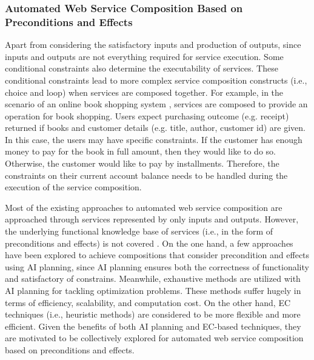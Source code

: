 \subsubsection{Automated Web Service Composition Based on Preconditions and Effects}
Apart from considering the satisfactory inputs and production of outputs, since inputs and outputs are not everything required for service execution. Some conditional constraints also determine the executability of services. These conditional constraints lead to more complex service composition constructs (i.e., choice and loop) when services are composed together. For example, in the scenario of an online book shopping system \cite{wang2014automated}, services are composed to provide an operation for book shopping.  Users expect purchasing outcome (e.g. receipt) returned if books and customer details (e.g. title, author, customer id) are given. In this case, the users may have specific constraints. If the customer has enough money to pay for the book in full amount, then they would like to do so. Otherwise, the customer would like to pay by installments. Therefore, the constraints on their current account balance needs to be handled during the execution of the service composition.

Most of the existing approaches to automated web service composition are approached through services represented by only inputs and outputs. However, the underlying functional knowledge base of services (i.e., in the form of preconditions and effects) is not covered \cite{paliwal2012semantics}. On the one hand, a few approaches \cite{bansal2016generalized,DBLP:journals/soca/BoustilMS14} have been explored to achieve compositions that consider precondition and effects using AI planning, since AI planning ensures both the correctness of functionality and satisfactory of constrains. Meanwhile, exhaustive methods are utilized with AI planning for tackling optimization problems. These methods suffer hugely in terms of efficiency, scalability, and computation cost. On the other hand, EC techniques (i.e., heuristic methods) are considered to be more flexible and more efficient. Given the benefits of both AI planning and EC-based techniques, they are motivated to be collectively explored for automated web service composition based on preconditions and effects.
 
